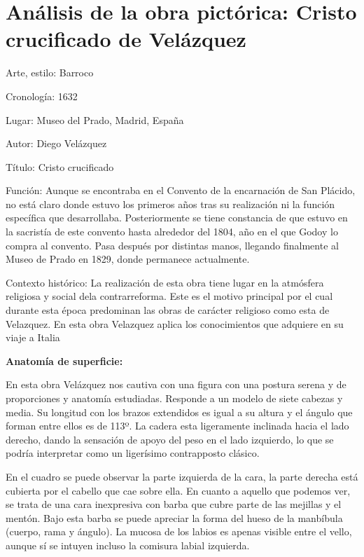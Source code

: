 \section{Análisis de la obra pictórica: Cristo crucificado de Velázquez } 

Arte, estilo: Barroco

Cronología: 1632

Lugar: Museo del Prado, Madrid, España

Autor: Diego Velázquez

Título: Cristo crucificado

Función: Aunque se encontraba en el Convento de la encarnación de San Plácido, no está claro donde estuvo los primeros años tras su realización ni la función específica que desarrollaba. Posteriormente se tiene constancia de que estuvo en la sacristía de este convento hasta alrededor del 1804, año en el que Godoy lo compra al convento. Pasa después por distintas manos, llegando finalmente al Museo de Prado en 1829, donde permanece actualmente. %

Contexto histórico: La realización de esta obra tiene lugar en la atmósfera religiosa y social dela contrarreforma. Este es el motivo principal por el cual durante esta época predominan las obras de carácter religioso como esta de Velazquez.
En esta obra Velazquez aplica los conocimientos que adquiere en su viaje a Italia

\textbf{Anatomía de superficie:}

En esta obra Velázquez nos cautiva con una figura con una postura serena y de proporciones y anatomía estudiadas. Responde a un modelo de siete cabezas y media. Su longitud con los brazos extendidos es igual a su altura y el ángulo que forman entre ellos es de 113º. La cadera esta ligeramente inclinada hacia el lado derecho, dando la sensación de apoyo del peso en el lado izquierdo, lo que se podría interpretar como un ligerísimo contrapposto clásico.

En el cuadro se puede observar la parte izquierda de la cara, la parte derecha está cubierta por el cabello que cae sobre ella. En cuanto a aquello que podemos ver, se trata de una cara inexpresiva con barba que cubre parte de las mejillas y el mentón. Bajo esta barba se puede apreciar la forma del hueso de la manbíbula (cuerpo, rama y ángulo). La mucosa de los labios es apenas visible entre el vello, aunque sí se intuyen incluso la comisura labial izquierda. 

